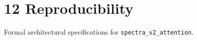 \section{12 Reproducibility}

Formal architectural specifications for \texttt{spectra_v2_attention}.
